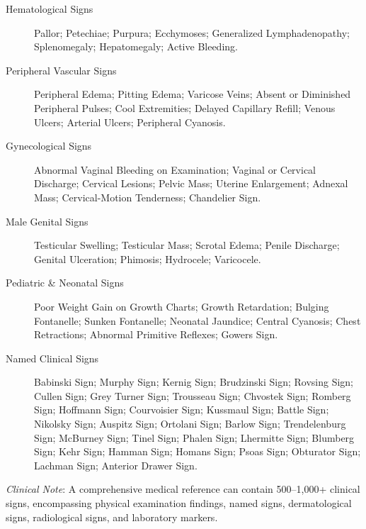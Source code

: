 \begin{description}
\item[Hematological Signs] Pallor; Petechiae; Purpura; Ecchymoses; Generalized Lymphadenopathy; Splenomegaly; Hepatomegaly; Active Bleeding.

\item[Peripheral Vascular Signs] Peripheral Edema; Pitting Edema; Varicose Veins; Absent or Diminished Peripheral Pulses; Cool Extremities; Delayed Capillary Refill; Venous Ulcers; Arterial Ulcers; Peripheral Cyanosis.

\item[Gynecological Signs] Abnormal Vaginal Bleeding on Examination; Vaginal or Cervical Discharge; Cervical Lesions; Pelvic Mass; Uterine Enlargement; Adnexal Mass; Cervical-Motion Tenderness; Chandelier Sign.

\item[Male Genital Signs] Testicular Swelling; Testicular Mass; Scrotal Edema; Penile Discharge; Genital Ulceration; Phimosis; Hydrocele; Varicocele.

\item[Pediatric \& Neonatal Signs] Poor Weight Gain on Growth Charts; Growth Retardation; Bulging Fontanelle; Sunken Fontanelle; Neonatal Jaundice; Central Cyanosis; Chest Retractions; Abnormal Primitive Reflexes; Gowers Sign.

\item[Named Clinical Signs] Babinski Sign; Murphy Sign; Kernig Sign; Brudzinski Sign; Rovsing Sign; Cullen Sign; Grey Turner Sign; Trousseau Sign; Chvostek Sign; Romberg Sign; Hoffmann Sign; Courvoisier Sign; Kussmaul Sign; Battle Sign; Nikolsky Sign; Auspitz Sign; Ortolani Sign; Barlow Sign; Trendelenburg Sign; McBurney Sign; Tinel Sign; Phalen Sign; Lhermitte Sign; Blumberg Sign; Kehr Sign; Hamman Sign; Homans Sign; Psoas Sign; Obturator Sign; Lachman Sign; Anterior Drawer Sign.
\end{description}

\medskip
\noindent\textit{Clinical Note}: A comprehensive medical reference can contain 500--1,000+ clinical signs, encompassing physical examination findings, named signs, dermatological signs, radiological signs, and laboratory markers.
